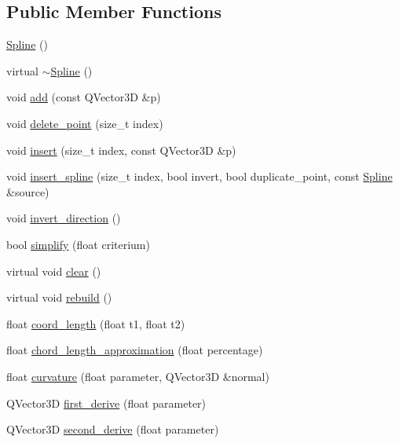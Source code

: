 \subsection*{Public Member Functions}
\begin{DoxyCompactItemize}
\item 
\hyperlink{classShipCAD_1_1Spline_a7ad84ea604562c7c9cb309b4e78e25c5}{Spline} ()
\item 
virtual \hyperlink{classShipCAD_1_1Spline_a0c900ca3c99987532e1d0c21ba992968}{$\sim$\-Spline} ()
\item 
void \hyperlink{classShipCAD_1_1Spline_ac3d9f4514573be91b316413bf062791a}{add} (const Q\-Vector3\-D \&p)
\item 
void \hyperlink{classShipCAD_1_1Spline_a120c5530571f138daad61426053220f3}{delete\-\_\-point} (size\-\_\-t index)
\item 
void \hyperlink{classShipCAD_1_1Spline_aa1ea6446e0b59d5cce88580242cd25b6}{insert} (size\-\_\-t index, const Q\-Vector3\-D \&p)
\item 
void \hyperlink{classShipCAD_1_1Spline_aa8e588b92d23c74bb6ec120624b49e54}{insert\-\_\-spline} (size\-\_\-t index, bool invert, bool duplicate\-\_\-point, const \hyperlink{classShipCAD_1_1Spline}{Spline} \&source)
\item 
void \hyperlink{classShipCAD_1_1Spline_a26293a4ee636c2b968c45731425d5c94}{invert\-\_\-direction} ()
\item 
bool \hyperlink{classShipCAD_1_1Spline_a043f418b363a0dc7161b9106a72ef8b4}{simplify} (float criterium)
\item 
virtual void \hyperlink{classShipCAD_1_1Spline_a02967f3eee8b1755eab0d7da55c3c621}{clear} ()
\item 
virtual void \hyperlink{classShipCAD_1_1Spline_a9b466ad7510032dafb0421f2d834bde6}{rebuild} ()
\item 
float \hyperlink{classShipCAD_1_1Spline_a9d4d64a34b1511efc5c41b9e31956a3e}{coord\-\_\-length} (float t1, float t2)
\item 
float \hyperlink{classShipCAD_1_1Spline_ae15513771d88f4f545048d4204e98325}{chord\-\_\-length\-\_\-approximation} (float percentage)
\item 
float \hyperlink{classShipCAD_1_1Spline_a5681a27480f934a73462e53b2b4e2461}{curvature} (float parameter, Q\-Vector3\-D \&normal)
\item 
Q\-Vector3\-D \hyperlink{classShipCAD_1_1Spline_afe15664ac97d1d3452d5a5cfd023c471}{first\-\_\-derive} (float parameter)
\item 
Q\-Vector3\-D \hyperlink{classShipCAD_1_1Spline_abe04c117432e350f3a9f66395d2d3037}{second\-\_\-derive} (float parameter)

\end{DoxyCompactItemize}
